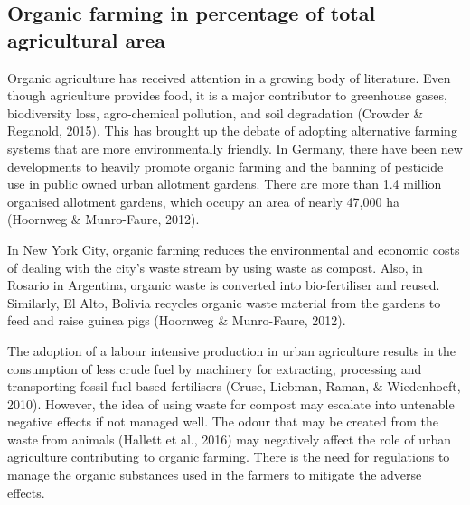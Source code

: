 \subsection{Organic farming in percentage of total agricultural area}

Organic agriculture has received attention in a growing body of literature. Even though agriculture provides food, it is a major contributor to greenhouse gases, biodiversity loss, agro-chemical pollution, and soil degradation (Crowder \& Reganold, 2015). This has brought up the debate of adopting alternative farming systems that are more environmentally friendly. In Germany, there have been new developments to heavily promote organic farming and the banning of pesticide use in public owned urban allotment gardens. There are more than 1.4 million organised allotment gardens, which occupy an area of nearly 47,000 ha (Hoornweg \& Munro-Faure, 2012).

In New York City, organic farming reduces the environmental and economic costs of dealing with the city's waste stream by using waste as compost. Also, in Rosario in Argentina, organic waste is converted into bio-fertiliser and reused. Similarly, El Alto, Bolivia recycles organic waste material from the gardens to feed and raise guinea pigs (Hoornweg \& Munro-Faure, 2012).

The adoption of a labour intensive production in urban agriculture results in the consumption of less crude fuel by machinery for extracting, processing and transporting fossil fuel based fertilisers (Cruse, Liebman, Raman, \& Wiedenhoeft, 2010). However, the idea of using waste for compost may escalate into untenable negative effects if not managed well. The odour that may be created from the waste from animals (Hallett et al., 2016) may negatively affect the role of urban agriculture contributing to organic farming. There is the need for regulations to manage the organic substances used in the farmers to mitigate the adverse effects.


